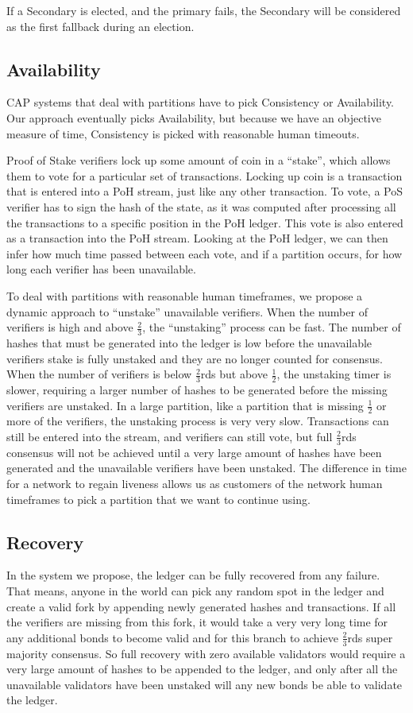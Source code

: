 \documentclass[12pt]{article}
\begin{document}
If a Secondary is elected, and the primary fails, the Secondary will be considered as the first fallback during an election.

\subsection{Availability}\label{availability}
CAP systems that deal with partitions have to pick Consistency or Availability. Our approach eventually picks Availability, but because we have an objective measure of time, Consistency is picked with reasonable human timeouts.

Proof of Stake verifiers lock up some amount of coin in a “stake”, which allows them to vote for a particular set of transactions. Locking up coin is a transaction that is entered into a PoH stream, just like any other transaction. To vote, a PoS verifier has to sign the hash of the state, as it was computed after processing all the transactions to a specific position in the PoH ledger. This vote is also entered as a transaction into the PoH stream. Looking at the PoH ledger, we can then infer how much time passed between each vote, and if a partition occurs, for how long each verifier has been unavailable.

To deal with partitions with reasonable human timeframes, we propose a dynamic approach to “unstake” unavailable verifiers. When the number of verifiers is high and above \(\frac{2}{3}\), the “unstaking” process can be fast. The number of hashes that must be generated into the ledger is low before the unavailable verifiers stake is fully unstaked and they are no longer counted for consensus. When the number of verifiers is below \(\frac{2}{3}\)rds but above \(\frac{1}{2}\), the unstaking timer is slower, requiring a larger number of hashes to be generated before the missing verifiers are unstaked. In a large partition, like a partition that is missing \(\frac{1}{2}\) or more of the verifiers, the unstaking process is very very slow. Transactions can still be entered into the stream, and verifiers can still vote, but full \(\frac{2}{3}\)rds consensus will not be achieved until a very large amount of hashes have been generated and the unavailable verifiers have been unstaked. The difference in time for a network to regain liveness allows us as customers of the network human timeframes to pick a partition that we want to continue using.

\subsection{Recovery}\label{availability}
In the system we propose, the ledger can be fully recovered from any failure. That means, anyone in the world can pick any random spot in the ledger and create a valid fork by appending newly generated hashes and transactions. If all the verifiers are missing from this fork, it would take a very very long time for any additional bonds to become valid and for this branch to achieve \(\frac{2}{3}\)rds super majority consensus. So full recovery with zero available validators would require a very large amount of hashes to be appended to the ledger, and only after all the unavailable validators have been unstaked will any new bonds be able to validate the ledger.
\end{document}
